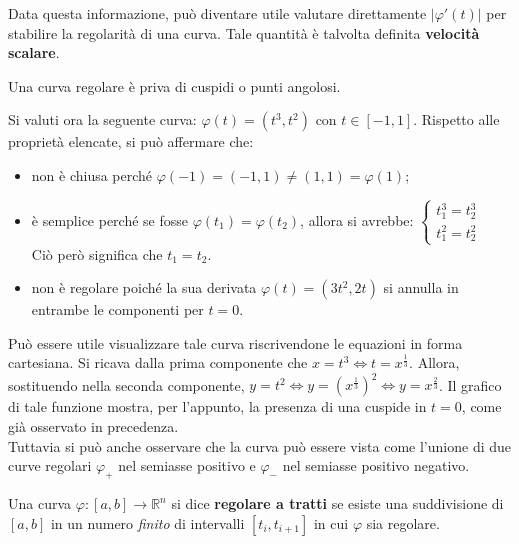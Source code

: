     \begin{oss}
        Data questa informazione, può diventare utile valutare direttamente $|\varphi'(t)|$ per stabilire la regolarità di una curva. Tale quantità è talvolta definita \textbf{velocità scalare}.
    \end{oss}
    \begin{oss}
        Una curva regolare è priva di cuspidi o punti angolosi.
    \end{oss}
\begin{example}
    Si valuti ora la seguente curva: $\varphi(t)=(t^3, t^2)$ con $t \in [-1, 1]$.
    Rispetto alle proprietà elencate, si può affermare che:
    \begin{itemize} 
        \item non è chiusa perché $\varphi(-1)=(-1,1)\neq(1,1)=\varphi(1)$;
        \item è semplice perché se fosse $\varphi(t_1) = \varphi(t_2)$, allora si avrebbe:
$
\begin{cases}
    t_1^3 = t_2^3 \\
    t_1^2 = t_2^2
\end{cases}
$
\\Ciò però significa che $t_1=t_2$.
    \item non è regolare poiché la sua derivata $\varphi(t)=(3t^2, 2t)$ si annulla in entrambe le componenti per $t=0$.
    \end{itemize}
Può essere utile visualizzare tale curva riscrivendone le equazioni in forma cartesiana. Si ricava dalla prima componente che $x=t^3 \iff t=x^\frac{1}{3}$. Allora, sostituendo nella seconda componente, $y=t^2 \iff y=\left(x^\frac{1}{3}\right)^2 \iff y=x^\frac{2}{3}$. Il grafico di tale funzione mostra, per l'appunto, la presenza di una cuspide in $t=0$, come già osservato in precedenza.\\
Tuttavia si può anche osservare che la curva può essere vista come l'unione di due curve regolari $\varphi_+$ nel semiasse positivo e $\varphi_-$ nel semiasse positivo negativo.
\end{example}
\begin{definition}
    Una curva $\varphi:[a,b]\to\mathbb{R}^n$ si dice \textbf{regolare a tratti} se esiste una suddivisione di $[a,b]$ in un numero \textit{finito} di intervalli $[t_i, t_{i+1}]$ in cui $\varphi$ sia regolare.
\end{definition}
